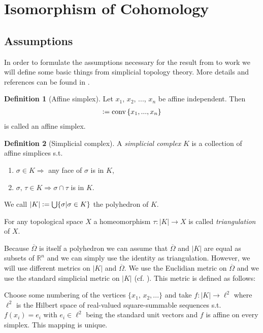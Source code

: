 \documentclass[12pt,a4paper]{article}
\theoremstyle{definition}
\newtheorem{definition}{Definition}
\newcommand{\omegabar}{\overline{\Omega}}
\newcommand{\real}{\mathbb{R}}
\begin{document}
\section{Isomorphism of Cohomology}

\subsection{Assumptions}
In order to formulate the assumptions necessary for the result from 
\cite{goldshtein} to work we will define some basic things from 
simplicial topology theory. More details and references can be found in 
\cite[Chapter 4.21]{topology_and_geometry}.

\begin{definition}[Affine simplex]
    Let $x_1$, $x_2$, ..., $x_n$ be affine independent. Then 
    \begin{align*}
    [x_1,x_2,...,x_n] \vcentcolon= \text{conv}\,\{x_1,...,x_n\}
    \end{align*}
    is called an affine simplex.
\end{definition}


\begin{definition}[Simplicial complex]
    A \textit{simplicial complex} $K$ is a collection of affine simplices s.t.
    \begin{enumerate}
        \item $\sigma \in K \Rightarrow$ any face of $\sigma$ is in $K$,
        \item $\sigma,\, \tau \in K \Rightarrow \sigma \cap \tau$ is in $K$.
    \end{enumerate}
    We call $|K| \vcentcolon= \bigcup \{ \sigma | \sigma \in K\}$ the polyhedron of 
    $K$.
\end{definition}
For any topological space $X$ a homeomorphism 
$\tau: |K| \rightarrow X$ is called \textit{triangulation} of $X$.


Because $\omegabar$ is itself a polyhedron we can
assume that $\omegabar$ and $|K|$ are equal as subsets of $\real^n$ and we can
simply use the identity as triangulation.
However, we will use different metrics on $|K|$ and $\omegabar$. 
We use the Euclidian metric on 
$\omegabar$ and we use the standard simplicial metric on $|K|$ (cf. 
\cite[p.191]{goldshtein}). This metric is defined as follows:

Choose some numbering of the vertices $\{ x_1,\, x_2, ... \}$ and
take $f: |K| \rightarrow \ell^2$ where $\ell^2$ is the 
Hilbert space of real-valued square-summable sequences s.t. $f(x_i) = e_i$ 
with $e_i \in \ell^2$ being the standard unit vectors and $f$ is affine on 
every simplex. This mapping is unique.%
\end{document}
